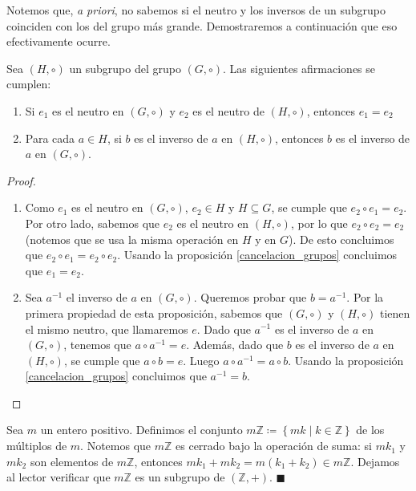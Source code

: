 Notemos que, \textit{a priori}, no sabemos si el neutro y los inversos de un subgrupo coinciden con los del grupo más grande. Demostraremos a continuación que eso efectivamente ocurre.


\begin{proposition}
Sea $(H, \circ)$ un subgrupo del grupo $(G, \circ)$. Las siguientes afirmaciones se cumplen:
	\begin{enumerate}
		\item Si $e_1$ es el neutro en $(G, \circ)$ y $e_2$ es el neutro de $(H, \circ)$, entonces $e_1 = e_2$

		\item Para cada $a \in H$, si $b$ es el inverso de $a$ en $(H, \circ)$, entonces $b$ es el inverso de $a$ en $(G, \circ)$.
	\end{enumerate}
\end{proposition}


\begin{proof} \text{ }
\begin{enumerate}
\item Como $e_1$ es el neutro en $(G, \circ)$, $e_2\in H$ y $H \subseteq G$, se cumple que $e_2 \circ e_1 = e_2$.
Por otro lado, sabemos que $e_2$ es el neutro en $(H, \circ)$, por lo que $e_2 \circ e_2 = e_2$
(notemos que se usa la misma operación en $H$ y en $G$).
De esto concluimos que $e_2 \circ e_1 = e_2 \circ e_2$. Usando la proposición \ref{cancelacion_grupos} concluimos que $e_1 = e_2$.
\item Sea $a^{-1}$ el inverso de $a$ en $(G, \circ)$. Queremos probar que $b = a^{-1}$. Por la primera propiedad de esta proposición, sabemos que $(G, \circ)$ y $(H,
\circ)$ tienen el mismo neutro, que llamaremos $e$. 
Dado que $a^{-1}$ es el inverso de $a$ en $(G, \circ)$, tenemos que $a \circ a^{-1} = e$. Además, dado que $b$ es el inverso de $a$ en $(H, \circ)$, se cumple que $a \circ b = e$. Luego $a \circ a^{-1} = a \circ b$. Usando la proposición \ref{cancelacion_grupos} concluimos que $a^{-1} = b$.
\end{enumerate}
\end{proof}

\begin{example} \label{ejemplo_subgrupo}
Sea $m$ un entero positivo. Definimos el conjunto
$m\mathbb{Z} \coloneq \left\{mk \mid k \in \mathbb{Z}\right\}$ de los múltiplos de $m$. Notemos que $m\mathbb{Z}$ es cerrado bajo la operación de suma: si $mk_1$ y $mk_2$ son elementos de $m\mathbb{Z}$, entonces $mk_1 + mk_2 = m(k_1 + k_2) \in m\mathbb{Z}$. Dejamos al lector verificar que $m\mathbb{Z}$ es un subgrupo de $(\mathbb{Z}, +)$. \hfill$\blacksquare$
\end{example}


